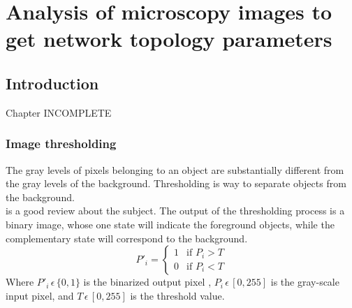
\chapter{Analysis of microscopy images to get network topology
parameters} %

\label{Chapter-Image} %


\section{Introduction}
Chapter INCOMPLETE
\subsection{Image thresholding}
The gray levels of pixels belonging to an object are substantially
different from the gray levels of the background. Thresholding is way to
separate objects from the background.\\
\citet{sezgin_survey_2004} is a good review about the subject. The output of the
thresholding process is a binary image, whose one state will indicate the
foreground objects, while the complementary state will correspond to the
background.\\
\begin{equation}
P'_i=
   \begin{cases} 
     1               & \mbox{if } P_i > T   \\
     0               & \mbox{if } P_i < T
   \end{cases}
   \label{eq:bin}
\end{equation}
Where $P'_i\,\epsilon \, \{0{,} 1\}$ is the binarized output pixel , $P_i\,
\epsilon \,[0{,}255]$ is the gray-scale input pixel, and $T\,
\epsilon \,[0{,}255]$ is the threshold value.\\
  
